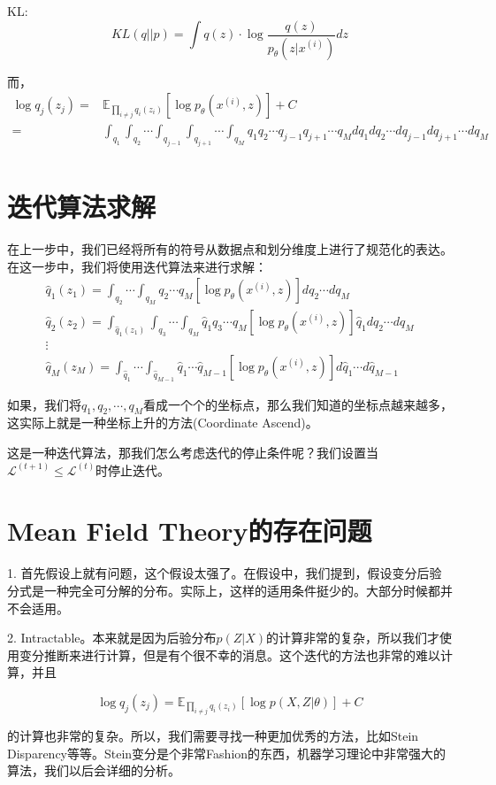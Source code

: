 \documentclass[a4paper]{article}
\begin{document}
KL:
\begin{equation}
    KL(q||p) = \int q(z)\cdot \log \frac{q(z)}{p_{\theta}(z|x^{(i)})} dz
\end{equation}

而，
\begin{equation}
    \begin{split}
        \log q_j(z_j) 
        = & \mathbb{E}_{\prod_{i \neq j} q_i(z_i)}\left[ \log p_{\theta} (x^{(i)},z) \right] + C \\
        = & \int_{q_1} \int_{q_2} \cdots \int_{q_{j-1}}\int_{q_{j+1}} \cdots \int_{q_{M}} q_1q_2\cdots q_{j-1}q_{j+1} \cdots q_M dq_1dq_2 \cdots dq_{j-1}dq_{j+1} \cdots dq_{M}  \\
    \end{split}
\end{equation}

\section{迭代算法求解}
在上一步中，我们已经将所有的符号从数据点和划分维度上进行了规范化的表达。在这一步中，我们将使用迭代算法来进行求解：
\begin{gather}
    \hat{q}_1(z_1) = \int_{q_2} \cdots \int_{q_{M}} q_2 \cdots q_M \left[ \log p_{\theta}(x^{(i)},z) \right]dq_2 \cdots dq_{M}  \\
    \hat{q}_2(z_2) = \int_{\hat{q}_1(z_1)}\int_{q_3} \cdots \int_{q_{M}} \hat{q}_1q_3 \cdots q_M \left[ \log p_{\theta}(x^{(i)},z) \right]\hat{q}_1dq_2 \cdots dq_{M}  \\
    \nonumber \vdots \\
    \hat{q}_M(z_M) = \int_{\hat{q}_1} \cdots \int_{\hat{q}_{M-1}} \hat{q}_1 \cdots \hat{q}_{M-1} \left[ \log p_{\theta}(x^{(i)},z) \right]d\hat{q}_1 \cdots d\hat{q}_{M-1}
\end{gather}

如果，我们将${q}_1,{q}_2,\cdots,{q}_M$看成一个个的坐标点，那么我们知道的坐标点越来越多，这实际上就是一种坐标上升的方法(Coordinate Ascend)。

这是一种迭代算法，那我们怎么考虑迭代的停止条件呢？我们设置当$\mathcal{L}^{(t+1)} \leq \mathcal{L}^{(t)}$时停止迭代。

\section{Mean Field Theory的存在问题}
1. 首先假设上就有问题，这个假设太强了。在假设中，我们提到，假设变分后验分式是一种完全可分解的分布。实际上，这样的适用条件挺少的。大部分时候都并不会适用。

2. Intractable。本来就是因为后验分布$p(Z|X)$的计算非常的复杂，所以我们才使用变分推断来进行计算，但是有个很不幸的消息。这个迭代的方法也非常的难以计算，并且

\begin{equation}
    \log q_j(z_j) = \mathbb{E}_{\prod_{i \neq j}q_i(z_i)}\left[ \log p(X,Z|\theta) \right] + C
\end{equation}

\noindent 的计算也非常的复杂。所以，我们需要寻找一种更加优秀的方法，比如Stein Disparency等等。Stein变分是个非常Fashion的东西，机器学习理论中非常强大的算法，我们以后会详细的分析。
\end{document}
